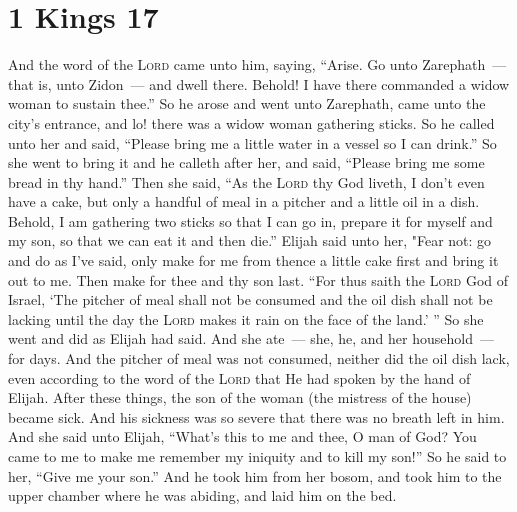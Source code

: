 \section{1 Kings 17}\label{1 Kings 17}
\begin{enumerate}[align=center]
     And the word of the \textsc{Lord} came unto him, saying,%
     ``Arise. Go unto Zarephath~--- that is, unto Zidon~--- and dwell there. Behold! I have there commanded a widow woman to sustain thee.''%
     So he arose and went unto Zarephath, came unto the city's entrance, and lo! there was a widow woman gathering sticks. So he called unto her and said, ``Please bring me a little water in a vessel so I can drink.''%
     So she went to bring it and he calleth after her, and said, ``Please bring me some bread in thy hand.''%
     Then she said, ``As the \textsc{Lord} thy God liveth, I don't even have a cake, but only a handful of meal in a pitcher and a little oil in a dish. Behold, I am gathering two sticks so that I can go in, prepare it for myself and my son, so that we can eat it and then die.''%
     Elijah said unto her, "Fear not: go and do as I've said, only make for me from thence a little cake first and bring it out to me. Then make for thee and thy son last.%
     ``For thus saith the \textsc{Lord} God of Israel, `The pitcher of meal shall not be consumed and the oil dish shall not be lacking until the day the \textsc{Lord} makes it rain on the face of the land.' ''%
     So she went and did as Elijah had said. And she ate~--- she, he, and her household~--- for days.%
     And the pitcher of meal was not consumed, neither did the oil dish lack, even according to the word of the \textsc{Lord} that He had spoken by the hand of Elijah.%
     After these things, the son of the woman (the mistress of the house) became sick. And his sickness was so severe that there was no breath left in him.%
     And she said unto Elijah, ``What's this to me and thee, O man of God? You came to me to make me remember my iniquity and to kill my son!''%
     So he said to her, ``Give me your son.'' And he took him from her bosom, and took him to the upper chamber where he was abiding, and laid him on the bed.%

\end{enumerate}
